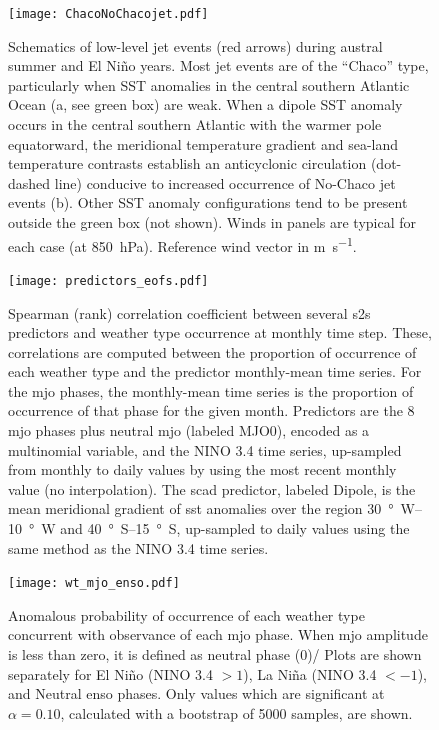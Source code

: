 \documentclass[twocol]{ametsoc}
\begin{document}
\begin{figure}
	\noindent\texttt{[image: ChacoNoChacojet.pdf]}
	\caption{
		Schematics of low-level jet events (red arrows) during austral summer and El Ni\~no years.
		Most jet events are of the ``Chaco'' type, particularly when SST anomalies in the central southern Atlantic Ocean (a, see green box) are weak.
		When a dipole SST anomaly occurs in the central southern Atlantic with the warmer pole equatorward, the meridional temperature gradient and sea-land temperature contrasts establish an anticyclonic circulation (dot-dashed line) conducive to increased occurrence of No-Chaco jet events (b).
		Other SST anomaly configurations tend to be present outside the green box (not shown).
		Winds in panels are typical for each case (at \SI{850}{\hecto\pascal}).
		Reference wind vector in \si{\meter\per\second}.
	}\label{fig:chaco-nochaco}
\end{figure}

\begin{figure}
	\texttt{[image: predictors\_eofs.pdf]}
	\caption{
		Spearman (rank) correlation coefficient between several \gls{s2s} predictors and weather type occurrence at monthly time step.
		These, correlations are computed between the proportion of occurrence of each weather type and the predictor monthly-mean time series.
		For the \gls{mjo} phases, the monthly-mean time series is the proportion of occurrence of that phase for the given month.
		Predictors are the 8 \gls{mjo} phases plus neutral \gls{mjo} (labeled MJO0), encoded as a multinomial variable, and the NINO 3.4 time series, up-sampled from monthly to daily values by using the most recent monthly value (no interpolation).
		The \acrfull{scad} predictor, labeled Dipole, is the mean meridional gradient of \gls{sst} anomalies over the region \SIrange{30}{10}{\degree W} and \SIrange{40}{15}{\degree S}, up-sampled to daily values using the same method as the NINO 3.4 time series.
	}\label{fig:predictor-eof}
\end{figure}

\begin{figure}
	\texttt{[image: wt\_mjo\_enso.pdf]}
	\caption{
		Anomalous probability of occurrence of each weather type concurrent with observance of each \gls{mjo} phase. 
		When \gls{mjo} amplitude is less than zero, it is defined as neutral phase (0)/
		Plots are shown separately for El Ni\~no (NINO 3.4 $>1$), La Ni\~na (NINO 3.4 $< -1$), and Neutral \gls{enso} phases.
		Only values which are significant at $\alpha=0.10$, calculated with a bootstrap of 5000 samples, are shown.
	}\label{fig:wt-mjo-enso}
\end{figure}
\end{document}
